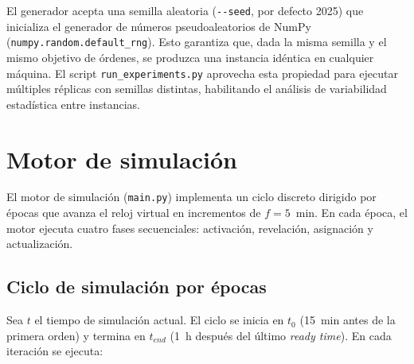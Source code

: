 \documentclass[12pt,letterpaper,oneside]{book}
\begin{document}
	El generador acepta una semilla aleatoria (\texttt{-{}-seed}, por defecto 2025) que
	inicializa el generador de números pseudoaleatorios de NumPy (\texttt{numpy.random.default\_rng}). 
	Esto garantiza que, dada la misma semilla y el mismo objetivo de órdenes, se produzca una 
	instancia idéntica en cualquier máquina. El script \texttt{run\_experiments.py} aprovecha esta 
	propiedad para ejecutar múltiples réplicas con semillas distintas, habilitando el análisis 
	de variabilidad estadística entre instancias.

	\section{Motor de simulación}

	El motor de simulación (\texttt{main.py}) implementa un ciclo discreto dirigido por épocas que
	avanza el reloj virtual en incrementos de $f = 5$~min. En cada época, el motor ejecuta cuatro
	fases secuenciales: activación, revelación, asignación y actualización.

	\subsection{Ciclo de simulación por épocas}

	Sea $t$ el tiempo de simulación actual. El ciclo se inicia en $t_0$ (15~min antes de la primera 
	orden) y termina en $t_{end}$ (1~h después del último \textit{ready time}). En cada iteración 
	se ejecuta:
\end{document}

